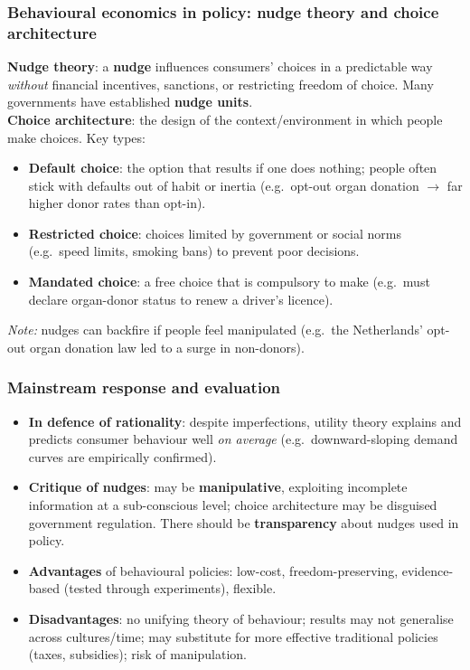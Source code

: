\documentclass[a4paper,12pt]{article}
\begin{document}
\subsubsection*{Behavioural economics in policy: nudge theory and choice architecture}
\textbf{Nudge theory}: a \textbf{nudge} influences consumers' choices in a predictable way \textit{without} financial incentives, sanctions, or restricting freedom of choice. Many governments have established \textbf{nudge units}.
\\
\textbf{Choice architecture}: the design of the context/environment in which people make choices. Key types:
\begin{itemize}
  \item \textbf{Default choice}: the option that results if one does nothing; people often stick with defaults out of habit or inertia (e.g.\ opt-out organ donation $\to$ far higher donor rates than opt-in).
  \item \textbf{Restricted choice}: choices limited by government or social norms (e.g.\ speed limits, smoking bans) to prevent poor decisions.
  \item \textbf{Mandated choice}: a free choice that is compulsory to make (e.g.\ must declare organ-donor status to renew a driver's licence).
\end{itemize}
\textit{Note:} nudges can backfire if people feel manipulated (e.g.\ the Netherlands' opt-out organ donation law led to a surge in non-donors).
\subsubsection*{Mainstream response and evaluation}
\begin{itemize}
  \item \textbf{In defence of rationality}: despite imperfections, utility theory explains and predicts consumer behaviour well \textit{on average} (e.g.\ downward-sloping demand curves are empirically confirmed).
  \item \textbf{Critique of nudges}: may be \textbf{manipulative}, exploiting incomplete information at a sub-conscious level; choice architecture may be disguised government regulation. There should be \textbf{transparency} about nudges used in policy.
  \item \textbf{Advantages} of behavioural policies: low-cost, freedom-preserving, evidence-based (tested through experiments), flexible.
  \item \textbf{Disadvantages}: no unifying theory of behaviour; results may not generalise across cultures/time; may substitute for more effective traditional policies (taxes, subsidies); risk of manipulation.
\end{itemize}
\end{document}
